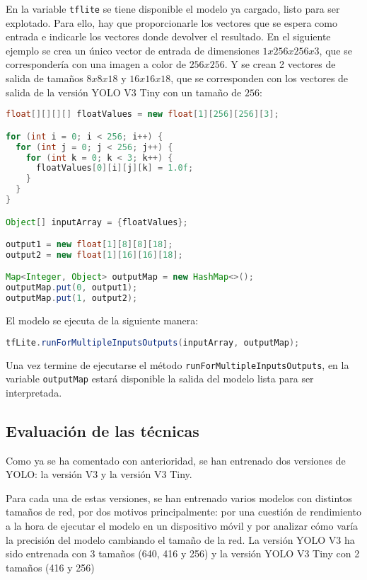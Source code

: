 En la variable \texttt{tflite} se tiene disponible el modelo ya cargado, listo para ser explotado. Para ello, hay que proporcionarle los vectores que se espera como entrada e indicarle los vectores donde devolver el resultado. En el siguiente ejemplo se crea un único vector de entrada de dimensiones $1 x 256 x 256 x 3$, que se correspondería con una imagen a color de $256x256$. Y se crean 2 vectores de salida de tamaños $8 x 8 x 18$ y $16 x 16 x 18$, que se corresponden con los vectores de salida de la versión YOLO V3 Tiny con un tamaño de $256$:

\begin{lstlisting}[frame=single, basicstyle=\ttfamily\footnotesize, language=Java, caption={Creación de vectores de entrada y de salida del modelo}, captionpos=b]
float[][][][] floatValues = new float[1][256][256][3];

for (int i = 0; i < 256; i++) {
  for (int j = 0; j < 256; j++) {
    for (int k = 0; k < 3; k++) {
      floatValues[0][i][j][k] = 1.0f;
    }
  }
}

Object[] inputArray = {floatValues};

output1 = new float[1][8][8][18];
output2 = new float[1][16][16][18];

Map<Integer, Object> outputMap = new HashMap<>();
outputMap.put(0, output1);
outputMap.put(1, output2);
\end{lstlisting}

El modelo se ejecuta de la siguiente manera:

\begin{lstlisting}[frame=single, basicstyle=\ttfamily\footnotesize, language=Java, caption={Cómo ejecutar el modelo}, captionpos=b]
tfLite.runForMultipleInputsOutputs(inputArray, outputMap);
\end{lstlisting}

Una vez termine de ejecutarse el método \texttt{runForMultipleInputsOutputs}, en la variable \texttt{outputMap} estará disponible la salida del modelo lista para ser interpretada.

\subsection{Evaluación de las técnicas}

Como ya se ha comentado con anterioridad, se han entrenado dos versiones de YOLO: la versión V3 y la versión V3 Tiny.

Para cada una de estas versiones, se han entrenado varios modelos con distintos tamaños de red, por dos motivos principalmente: por una cuestión de rendimiento a la hora de ejecutar el modelo en un dispositivo móvil y por analizar cómo varía la precisión del modelo cambiando el tamaño de la red. La versión YOLO V3 ha sido entrenada con 3 tamaños (640, 416 y 256) y la versión YOLO V3 Tiny con 2 tamaños (416 y 256)

